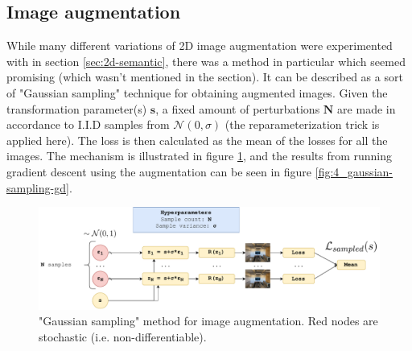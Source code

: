 \subsection{Image augmentation} 
While many different variations of 2D image augmentation were experimented with in section \ref{sec:2d-semantic}, there was a method in particular which seemed promising (which wasn't mentioned in the section). It can be described as a sort of "Gaussian sampling" technique for obtaining augmented images. Given the transformation parameter(s) $\textbf{s}$, a fixed amount of perturbations $\textbf{N}$ are made in accordance to I.I.D samples from $\mathcal{N}(0,\sigma)$ (the reparameterization trick is applied here). The loss is then calculated as the mean of the losses for all the images. The mechanism is illustrated in figure \ref{fig:4_gaussian-sampling}, and the results from running gradient descent using the augmentation can be seen in figure \ref{fig:4_gaussian-sampling-gd}.
\begin{figure}[H]
    \centering
    \includegraphics[width=1.0\textwidth]{figures/4_gaussian-sampling.pdf}
    \caption{"Gaussian sampling" method for image augmentation. Red nodes are stochastic (i.e. non-differentiable).}
    \label{fig:4_gaussian-sampling}
\end{figure}

